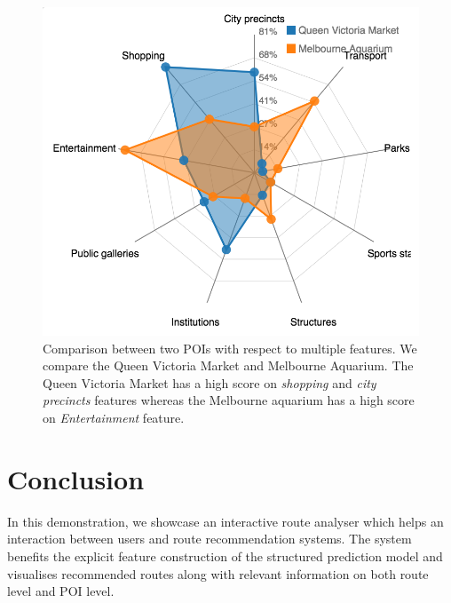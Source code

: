 \documentclass[sigconf]{acmart}
\begin{document}
\begin{figure}[t!]
\includegraphics[width=0.8\linewidth]{figure/sample_radar.png}
\caption{Comparison between two POIs with respect to multiple features. We compare the Queen Victoria Market and Melbourne Aquarium. The Queen Victoria Market has a high score on \textit{shopping} and \textit{city precincts} features whereas the Melbourne aquarium has a high score on \textit{Entertainment} feature.}
\label{fig:radar}
\end{figure}


\section{Conclusion}
In this demonstration, we showcase an interactive route analyser which helps an interaction between users and route recommendation systems. 
The system benefits the explicit feature construction of the structured prediction model and visualises recommended routes along with relevant information on both route level and POI level.


 
\end{document}
